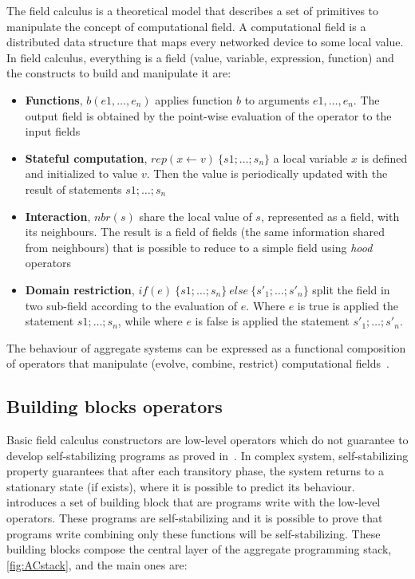 The field calculus is a theoretical model that describes a set of primitives to manipulate the concept of computational field. A computational field is a distributed data structure that maps every networked device to some local value. In field calculus, everything is a field (value, variable, expression, function) and the constructs to build and manipulate it are:
\begin{itemize}
    \item \textbf{Functions}, $b(e1,\dots,e_n)$ applies function $b$ to arguments $e1,\dots,e_n$. The output field is obtained by the point-wise evaluation of the operator to the input fields
    \item \textbf{Stateful computation}, $rep(x \leftarrow v)~\{s1; \dots ; s_n\}$ a local variable $x$ is defined and initialized to value $v$. Then the value is periodically updated with the result of statements $s1; \dots ; s_n$
    \item \textbf{Interaction}, $nbr(s)$ share the local value of $s$, represented as a field, with its neighbours. The result is a field of fields (the same information shared from neighbours) that is possible to reduce to a simple field using \textit{hood} operators
    \item \textbf{Domain restriction}, $if(e)~\{s1; \dots ; s_n\}~else~\{s'_1; \dots ; s'_n\}$ split the field in two sub-field according to the evaluation of $e$. Where $e$ is true is applied the statement $s1; \dots ; s_n$, while where $e$ is false is applied the statement $s'_1; \dots ; s'_n$.
\end{itemize}

The behaviour of aggregate systems can be expressed as a functional composition of operators that manipulate (evolve, combine, restrict) computational fields~\cite{type-sound}.

\subsection{Building blocks operators}
Basic field calculus constructors are low-level operators which do not guarantee to develop self-stabilizing programs as proved in~\cite{DBLP:journals/corr/abs-1711-08297}.
In complex system, self-stabilizing property guarantees that after each transitory phase, the system returns to a stationary state (if exists), where it is possible to predict its behaviour. 
\cite{buildingBlock} introduces a set of building block that are programs write with the low-level operators.
These programs are self-stabilizing and it is possible to prove that programs write combining only these functions will be self-stabilizing.
These building blocks compose the central layer of the aggregate programming stack, \autoref{fig:ACstack}, and the main ones are:

